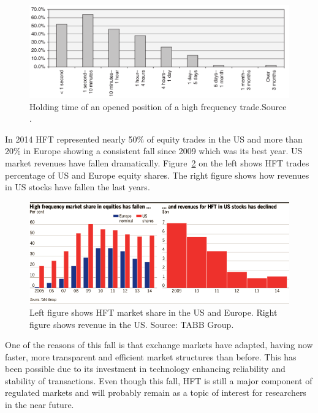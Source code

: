 \begin{figure}[!h]
  \centering
  \includegraphics[width=\textwidth]{img/HFTtradestime}
  \caption[Holding time of an opened position of a high frequency trade]{Holding time of an opened position of a high frequency trade.Source
  \cite{aldridge2009}.}
  \label{fig:HFTtimes}
\end{figure}
In 2014 HFT represented nearly 50\% of equity trades in the US and more than
20\% in Europe showing a consistent fall since 2009 which was its best year. US
market revenues have fallen dramatically.  Figure~\ref{fig:HFTmarket} on the
left shows HFT trades percentage of US and Europe equity shares. The right
figure shows how revenues in US stocks have fallen the last years.

\begin{figure}[!h]
  \centering
  \includegraphics[width=\textwidth]{img/HFTmarket}
  \caption[HFT market share in the US and Europe]{Left figure shows HFT market share in the US and Europe. Right figure
  shows revenue in the US. Source: TABB Group.}
  \label{fig:HFTmarket}
\end{figure}
One of the reasons of this fall is that exchange markets have adapted, having
now faster, more transparent and efficient market structures than before.
This has been possible due to its investment in technology enhancing
reliability and stability of transactions. Even though this fall, HFT is still a major component of regulated markets and
will probably remain as a topic of interest for researchers in the near future.

